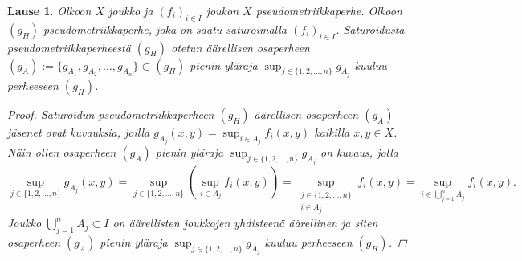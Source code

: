 \documentclass[12pt,a4paper,leqno]{report}
\theoremstyle{plain}
\newtheorem{lause}[equation]{Lause}
\theoremstyle{definition}
\theoremstyle{remark}
\begin{document}
\begin{lause}\label{saturoitu lause}
Olkoon $X$ joukko ja $(f_i)_{i\in I} $ joukon $X$ pseudometriikkaperhe. 
Olkoon $(g_{H})$ pseudometriikkaperhe, joka on saatu saturoimalla $(f_{i})_{i\in I}$. 
Saturoidusta pseudometriikkaperheestä $(g_{H})$ otetun 
äärellisen osaperheen 
$(g_A):=\{g_{A_1},g_{A_2},\dots,g_{A_n}\}\subset (g_{H})$ 
pienin yläraja 
$\sup_{j\in \{1,2,\dots , n\}}g_{A_j}$ 
kuuluu perheeseen $(g_H)$. 
\begin{proof}
Saturoidun pseudometriikkaperheen $(g_{H})$ 
äärellisen osaperheen 
$(g_A)$ jäsenet ovat kuvauksia, joilla 
$g_{A_j}(x,y)=\sup_{i\in A_j}f_i(x,y)$ kaikilla $x,y\in X$.
Näin ollen osaperheen 
$(g_A)$ pienin yläraja 
$\sup_{j\in \{1,2,\dots , n\}}g_{A_j}$ on kuvaus, 
jolla 
$$\sup_{j\in \{1,2,\dots , n\}}g_{A_j}(x,y)
=\sup_{j\in \{1,2,\dots , n\}}\left(\sup_{i\in A_j}f_i(x,y)\right)
=\sup_{\substack{j\in \{1,2,\dots , n\}\\i\in A_j}}f_i(x,y)
=\sup_{i\in \bigcup_{j=1}^n A_j}f_i(x,y)
.$$ 
Joukko $\bigcup_{j=1}^n A_j\subset I$ on äärellisten joukkojen 
yhdisteenä äärellinen ja siten 
osaperheen 
$(g_A)$ pienin yläraja $\sup_{j\in \{1,2,\dots , n\}}g_{A_j}$ kuuluu perheeseen $(g_H)$.
\end{proof}
\newpage
\end{lause}
\end{document}
